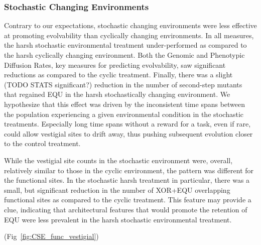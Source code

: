 \documentclass[10pt,letterpaper]{article}
\begin{document}
\subsubsection*{Stochastic Changing Environments}

Contrary to our expectations, stochastic changing environments were less effective at promoting evolvability than cyclically changing environments. In all measures, the harsh stochastic environmental treatment under-performed as compared to the harsh cyclically changing environment. Both the Genomic and Phenotypic Diffusion Rates, key measures for predicting evolvability, saw significant reductions as compared to the cyclic treatment. Finally, there was a slight (TODO STATS significant?) reduction in the number of second-step mutants that regained EQU in the harsh stochastically changing environment. We hypothesize that this effect was driven by the inconsistent time spans between the population experiencing a given environmental condition in the stochastic treatments. Especially long time spans without a reward for a task, even if rare, could allow vestigial sites to drift away, thus pushing subsequent evolution closer to the control treatment.

While the vestigial site counts in the stochastic environment were, overall, relatively similar to those in the cyclic environment, the pattern was different for the functional sites. In the stochastic harsh treatment in particular, there was a small, but significant reduction in the number of XOR+EQU overlapping functional sites as compared to the cyclic treatment. This feature may provide a clue, indicating that architectural features that would promote the retention of EQU were less prevalent in the harsh stochastic environmental treatment.

(Fig~\ref{fig:CSE_func_vestigial})
\end{document}
